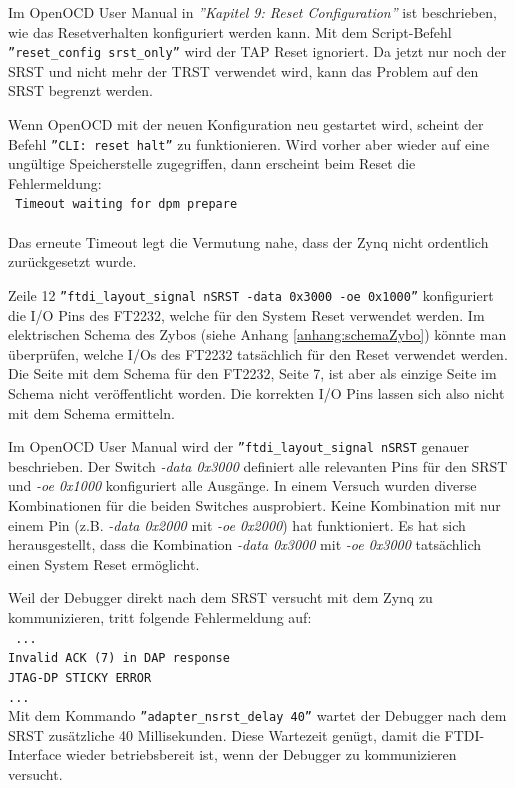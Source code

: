 Im OpenOCD User Manual\cite{bib:OpenOCDDoku} in \textit{''Kapitel 9: Reset Configuration''} ist beschrieben, wie das Resetverhalten konfiguriert werden kann.
Mit dem Script-Befehl \texttt{''reset\_config srst\_only''} wird der TAP Reset ignoriert.
Da jetzt nur noch der SRST und nicht mehr der TRST verwendet wird, kann das Problem auf den SRST begrenzt werden.

Wenn OpenOCD mit der neuen Konfiguration neu gestartet wird, scheint der Befehl \texttt{''CLI: reset halt''} zu funktionieren.
Wird vorher aber wieder auf eine ungültige Speicherstelle zugegriffen, dann erscheint beim Reset die Fehlermeldung:\\
\texttt{
Timeout waiting for dpm prepare\\
}\\
Das erneute Timeout legt die Vermutung nahe, dass der Zynq nicht ordentlich zurückgesetzt wurde.

Zeile 12 \texttt{''ftdi\_layout\_signal nSRST -data 0x3000 -oe 0x1000''} konfiguriert die I/O Pins des FT2232, welche für den System Reset verwendet werden.
Im elektrischen Schema des Zybos (siehe Anhang \ref{anhang:schemaZybo}) könnte man überprüfen, welche I/Os des FT2232 tatsächlich für den Reset verwendet werden.
Die Seite mit dem Schema für den FT2232, Seite 7, ist aber als einzige Seite im Schema nicht veröffentlicht worden.
Die korrekten I/O Pins lassen sich also nicht mit dem Schema ermitteln.

Im OpenOCD User Manual\cite{bib:OpenOCDDoku} wird der \texttt{''ftdi\_layout\_signal nSRST} genauer beschrieben.
Der Switch \textit{-data 0x3000} definiert alle relevanten Pins für den SRST und \textit{-oe 0x1000} konfiguriert alle Ausgänge.
In einem Versuch wurden diverse Kombinationen für die beiden Switches ausprobiert.
Keine Kombination mit nur einem Pin (z.B. \textit{-data 0x2000} mit \textit{-oe 0x2000}) hat funktioniert.
Es hat sich herausgestellt, dass die Kombination \textit{-data 0x3000} mit \textit{-oe 0x3000} tatsächlich einen System Reset ermöglicht.

Weil der Debugger direkt nach dem SRST versucht mit dem Zynq zu kommunizieren, tritt folgende Fehlermeldung auf:\\
\texttt{
...\\
Invalid ACK (7) in DAP response\\
JTAG-DP STICKY ERROR\\
...\\
}
Mit dem Kommando \texttt{''adapter\_nsrst\_delay 40''} wartet der Debugger nach dem SRST zusätzliche 40 Millisekunden.
Diese Wartezeit genügt, damit die FTDI-Interface wieder betriebsbereit ist, wenn der Debugger zu kommunizieren versucht.




